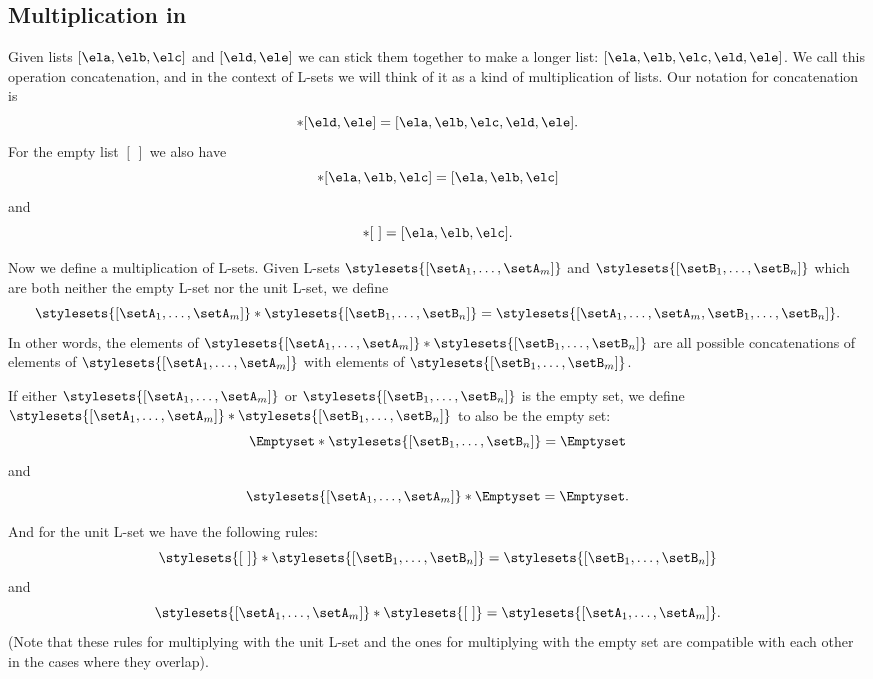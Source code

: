 \subsection{Multiplication in \cCat{\Set}}

Given lists $[\ela, \elb, \elc]$ and $[\eld, \ele]$ we can stick them together to make a longer list: $[\ela, \elb, \elc, \eld, \ele]$.
We call this operation concatenation, and in the context of L-sets we will think of it as a kind of multiplication of lists.
Our notation for concatenation is
\begin{equation}
    [\ela, \elb, \elc] * [\eld, \ele] = [\ela, \elb, \elc, \eld, \ele].
\end{equation}
For the empty list $[ \ ]$ we also have
\begin{equation}
    [ \ ] * [\ela, \elb, \elc]  = [\ela, \elb, \elc]
\end{equation}
and
\begin{equation}
    [\ela, \elb, \elc]  * [ \ ] = [\ela, \elb, \elc].
\end{equation}

Now we define a multiplication of L-sets.
Given L-sets $\stylesets{[\setA_1, \dots, \setA_m]}$ and $\stylesets{[\setB_1,  \dots, \setB_n]}$ which are both neither the empty L-set nor the unit L-set, we define
\begin{equation}
    \stylesets{[\setA_1, \dots, \setA_m]} * \stylesets{[\setB_1, \dots, \setB_n]} = \stylesets{[\setA_1, \dots, \setA_m, \setB_1,  \dots, \setB_n]}.
\end{equation}
In other words, the elements of $\stylesets{[\setA_1, \dots, \setA_m]} * \stylesets{[\setB_1, \dots, \setB_n]}$ are all possible concatenations of elements of $\stylesets{[\setA_1, \dots, \setA_m]}$ with elements of $\stylesets{[\setB_1, \dots, \setB_m]}$.

If either $\stylesets{[\setA_1, \dots, \setA_m]}$ or $\stylesets{[\setB_1, \dots, \setB_n]}$ is the empty set, we define $\stylesets{[\setA_1, \dots, \setA_m]} * \stylesets{[\setB_1, \dots, \setB_n]}$ to also be the empty set:
\begin{equation}
    \Emptyset * \stylesets{[\setB_1, \dots, \setB_n]} = \Emptyset
\end{equation}
and
\begin{equation}
    \stylesets{[\setA_1, \dots, \setA_m]} * \Emptyset = \Emptyset.
\end{equation}

And for the unit L-set we have the following rules:
\begin{equation}
    \stylesets{[ \ ]} * \stylesets{[\setB_1, \dots, \setB_n]} = \stylesets{[\setB_1,  \dots, \setB_n]}
\end{equation}
and
\begin{equation}
    \stylesets{[\setA_1, \dots, \setA_m]} * \stylesets{[ \ ]} = \stylesets{[\setA_1, \dots, \setA_m]}.
\end{equation}
(Note that these rules for multiplying with the unit L-set and the ones for multiplying with the empty set are compatible with each other in the cases where they overlap).

